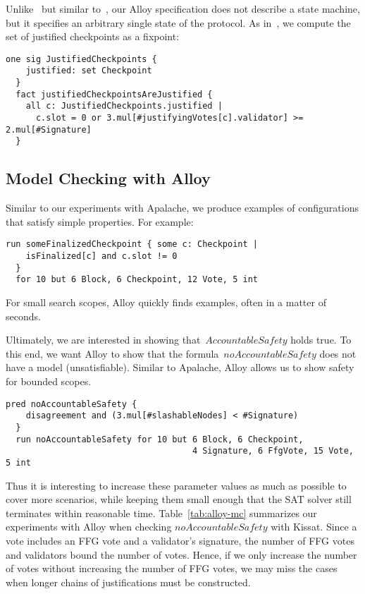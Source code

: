Unlike~\SpecThree{} but similar to~\SpecThreeB{}, our Alloy specification does
not describe a state machine, but it specifies an arbitrary single state of the
protocol. As in~\SpecThree{}, we compute the set of justified checkpoints as a
fixpoint:

\begin{lstlisting}[language=alloy,columns=fullflexible]
  one sig JustifiedCheckpoints {
    justified: set Checkpoint
  }
  fact justifiedCheckpointsAreJustified {
    all c: JustifiedCheckpoints.justified |
      c.slot = 0 or 3.mul[#justifyingVotes[c].validator] >= 2.mul[#Signature]
  }
\end{lstlisting}

\subsection{Model Checking with Alloy}

Similar to our experiments with Apalache, we produce examples of configurations
that satisfy simple properties. For example:

\begin{lstlisting}[language=alloy,columns=fullflexible]
  run someFinalizedCheckpoint { some c: Checkpoint |
    isFinalized[c] and c.slot != 0
  }
  for 10 but 6 Block, 6 Checkpoint, 12 Vote, 5 int
\end{lstlisting}

For small search scopes, Alloy quickly finds examples, often in a matter
of seconds.

Ultimately, we are interested in showing that~$\textit{AccountableSafety}$
holds true. To this end, we want Alloy to show that the
formula~$\textit{noAccountableSafety}$ does not have a model (unsatisfiable).
Similar to Apalache, Alloy allows us to show safety for bounded scopes.

\begin{lstlisting}[language=alloy,columns=fullflexible]
  pred noAccountableSafety {
    disagreement and (3.mul[#slashableNodes] < #Signature)
  }
  run noAccountableSafety for 10 but 6 Block, 6 Checkpoint,
                                     4 Signature, 6 FfgVote, 15 Vote, 5 int
\end{lstlisting}

Thus it is interesting to increase these parameter values as much as possible
to cover more scenarios, while keeping them small enough that the SAT solver
still terminates within reasonable time. Table~\ref{tab:alloy-mc} summarizes
our experiments with Alloy when checking $\textit{noAccountableSafety}$ with
Kissat.  Since a vote includes an FFG vote and a validator's signature, the
number of FFG votes and validators bound the number of votes. Hence, if we only
increase the number of votes without increasing the number of FFG votes, we may
miss the cases when longer chains of justifications must be constructed.


